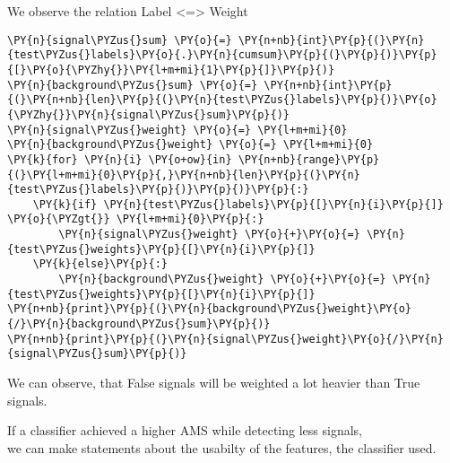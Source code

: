     We observe the relation Label \textless{}=\textgreater{} Weight


{\par%
\vspace{-1\baselineskip}%
}%
\begin{notebookcell}[]%
\begin{addmargin}[\cellleftmargin]{0em}%
{\smaller%
\par%
%
\vspace{-1\smallerfontscale}%
\begin{Verbatim}[commandchars=\\\{\}]
\PY{n}{signal\PYZus{}sum} \PY{o}{=} \PY{n+nb}{int}\PY{p}{(}\PY{n}{test\PYZus{}labels}\PY{o}{.}\PY{n}{cumsum}\PY{p}{(}\PY{p}{)}\PY{p}{[}\PY{o}{\PYZhy{}}\PY{l+m+mi}{1}\PY{p}{]}\PY{p}{)}
\PY{n}{background\PYZus{}sum} \PY{o}{=} \PY{n+nb}{int}\PY{p}{(}\PY{n+nb}{len}\PY{p}{(}\PY{n}{test\PYZus{}labels}\PY{p}{)}\PY{o}{\PYZhy{}}\PY{n}{signal\PYZus{}sum}\PY{p}{)}
\PY{n}{signal\PYZus{}weight} \PY{o}{=} \PY{l+m+mi}{0}
\PY{n}{background\PYZus{}weight} \PY{o}{=} \PY{l+m+mi}{0}
\PY{k}{for} \PY{n}{i} \PY{o+ow}{in} \PY{n+nb}{range}\PY{p}{(}\PY{l+m+mi}{0}\PY{p}{,}\PY{n+nb}{len}\PY{p}{(}\PY{n}{test\PYZus{}labels}\PY{p}{)}\PY{p}{)}\PY{p}{:}
    \PY{k}{if} \PY{n}{test\PYZus{}labels}\PY{p}{[}\PY{n}{i}\PY{p}{]} \PY{o}{\PYZgt{}} \PY{l+m+mi}{0}\PY{p}{:}
        \PY{n}{signal\PYZus{}weight} \PY{o}{+}\PY{o}{=} \PY{n}{test\PYZus{}weights}\PY{p}{[}\PY{n}{i}\PY{p}{]}
    \PY{k}{else}\PY{p}{:}
        \PY{n}{background\PYZus{}weight} \PY{o}{+}\PY{o}{=} \PY{n}{test\PYZus{}weights}\PY{p}{[}\PY{n}{i}\PY{p}{]}
\PY{n+nb}{print}\PY{p}{(}\PY{n}{background\PYZus{}weight}\PY{o}{/}\PY{n}{background\PYZus{}sum}\PY{p}{)}
\PY{n+nb}{print}\PY{p}{(}\PY{n}{signal\PYZus{}weight}\PY{o}{/}\PY{n}{signal\PYZus{}sum}\PY{p}{)}
\end{Verbatim}
%
\par%
\vspace{-1\smallerfontscale}}%
\end{addmargin}
\end{notebookcell}


    We can observe, that False signals will be weighted a lot heavier than
True signals.

If a classifier achieved a higher AMS while detecting less signals,\\
we can make statements about the usabilty of the features, the
classifier used.

